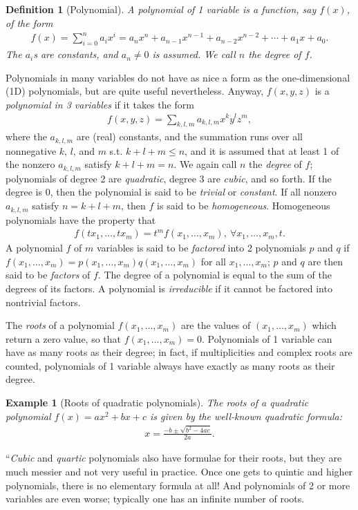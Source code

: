 \documentclass[oneside]{book}
\numberwithin{equation}{section}
\newtheorem{definition}{Definition}[section]
\newtheorem{example}{Example}[section]
\begin{document}
\begin{definition}[Polynomial]
	A \emph{polynomial of 1 variable} is a function, say $f(x)$, of the form
	\begin{align*}
		f(x) = \sum_{i=0}^n a_ix^i = a_nx^n + a_{n-1}x^{n-1} + a_{n-2}x^{n-2} + \cdots + a_1x + a_0.
	\end{align*}
	The $a_i$s are constants, and $a_n\ne 0$ is assumed. We call $n$ the \emph{degree} of $f$.
\end{definition}
Polynomials in many variables do not have as nice a form as the one-dimensional (1D) polynomials, but are quite useful nevertheless. Anyway, $f(x,y,z)$ is a \emph{polynomial in 3 variables} if it takes the form
\begin{align*}
	f(x,y,z) = \sum_{k,l,m} a_{k,l,m}x^ky^lz^m,
\end{align*}
where the $a_{k,l,m}$ are (real) constants, and the summation runs over all nonnegative $k$, $l$, and $m$ s.t. $k + l + m\le n$, and it is assumed that at least 1 of the nonzero $a_{k,l,m}$ satisfy $k + l + m = n$. We again call $n$ the \emph{degree} of $f$; polynomials of degree 2 are \textit{quadratic}, degree 3 are \emph{cubic}, and so forth. If the degree is 0, then the polynomial is said to be \emph{trivial} or \emph{constant}. If all nonzero $a_{k,l,m}$ satisfy $n = k + l + m$, then $f$ is said to be \emph{homogeneous}. Homogeneous polynomials have the property that
\begin{align*}
	f(tx_1,\ldots,tx_m) = t^mf(x_1,\ldots,x_m),\ \forall x_1,\ldots,x_m,t.
\end{align*}
A polynomial $f$ of $m$ variables is said to be \emph{factored} into 2 polynomials $p$ and $q$ if $f(x_1,\ldots,x_m) = p(x_1,\ldots,x_m)q(x_1,\ldots,x_m)$ for all $x_1,\ldots,x_m$; $p$ and $q$ are then said to be \emph{factors} of $f$. The degree of a polynomial is equal to the sum of the degrees of its factors. A polynomial is \emph{irreducible} if it cannot be factored into nontrivial factors.

The \emph{roots} of a polynomial $f(x_1,\ldots,x_m)$ are the values of $(x_1,\ldots,x_m)$ which return a zero value, so that $f(x_1,\ldots,x_m) = 0$. Polynomials of 1 variable can have as many roots as their degree; in fact, if multiplicities and complex roots are counted, polynomials of 1 variable always have exactly as many roots as their degree.

\begin{example}[Roots of quadratic polynomials]
	The roots of a quadratic polynomial $f(x) = ax^2 + bx + c$ is given by the well-known \emph{quadratic formula}:
	\begin{align*}
		x = \frac{-b\pm\sqrt{b^2 - 4ac}}{2a}.
	\end{align*}
\end{example}
``\textit{Cubic} and \textit{quartic} polynomials also have formulae for their roots, but they are much messier and not very useful in practice. Once one gets to quintic and higher polynomials, there is no elementary formula at all! And polynomials of 2 or more variables are even worse; typically one has an infinite number of roots.
\end{document}
